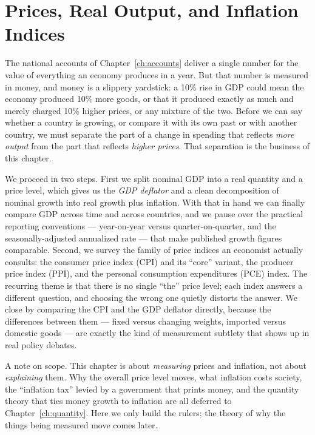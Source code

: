 \chapter{Prices, Real Output, and Inflation Indices}
\label{ch:prices}

The national accounts of Chapter~\ref{ch:accounts} deliver a single number for the value of everything an economy produces in a year. But that number is measured in money, and money is a slippery yardstick: a 10\% rise in GDP could mean the economy produced 10\% more goods, or that it produced exactly as much and merely charged 10\% higher prices, or any mixture of the two. Before we can say whether a country is growing, or compare it with its own past or with another country, we must separate the part of a change in spending that reflects \emph{more output} from the part that reflects \emph{higher prices}. That separation is the business of this chapter.

We proceed in two steps. First we split nominal GDP into a real quantity and a price level, which gives us the \emph{GDP deflator} and a clean decomposition of nominal growth into real growth plus inflation. With that in hand we can finally compare GDP across time and across countries, and we pause over the practical reporting conventions --- year-on-year versus quarter-on-quarter, and the seasonally-adjusted annualized rate --- that make published growth figures comparable. Second, we survey the family of price indices an economist actually consults: the consumer price index (CPI) and its ``core'' variant, the producer price index (PPI), and the personal consumption expenditures (PCE) index. The recurring theme is that there is no single ``the'' price level; each index answers a different question, and choosing the wrong one quietly distorts the answer. We close by comparing the CPI and the GDP deflator directly, because the differences between them --- fixed versus changing weights, imported versus domestic goods --- are exactly the kind of measurement subtlety that shows up in real policy debates.

A note on scope. This chapter is about \emph{measuring} prices and inflation, not about \emph{explaining} them. Why the overall price level moves, what inflation costs society, the ``inflation tax'' levied by a government that prints money, and the quantity theory that ties money growth to inflation are all deferred to Chapter~\ref{ch:quantity}. Here we only build the rulers; the theory of why the things being measured move comes later.

